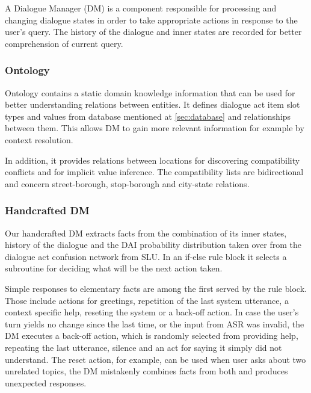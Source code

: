 A Dialogue Manager (DM) is a component responsible for processing and changing dialogue states in order to take appropriate actions in response to the user's query.
The history of the dialogue and inner states are recorded for better comprehension of current query.

\subsubsection{Ontology}

Ontology contains a static domain knowledge information that can be used for better understanding relations between entities.
It defines dialogue act item slot types and values from database mentioned at \ref{sec:database} and relationships between them.
This allows DM to gain more relevant information for example by context resolution.

In addition, it provides relations between locations for discovering compatibility conflicts and for implicit value inference.
The compatibility lists are bidirectional and concern street-borough, stop-borough and city-state relations.

\subsubsection{Handcrafted DM}

Our handcrafted DM extracts facts from the combination of its inner states, history of the dialogue and the DAI probability distribution taken over from the dialogue act confusion network from SLU.
In an if-else rule block it selects a subroutine for deciding what will be the next action taken.

Simple responses to elementary facts are among the first served by the rule block.
Those include actions for greetings, repetition of the last system utterance, a context specific help, reseting the system or a back-off action.
In case the user's turn yields no change since the last time, or the input from ASR was invalid, the DM executes a back-off action, which is randomly selected from providing help, repeating the last utterance, silence and an act for saying it simply did not understand.
The reset action, for example, can be used when user asks about two unrelated topics, the DM mistakenly combines facts from both and 
produces unexpected responses.

